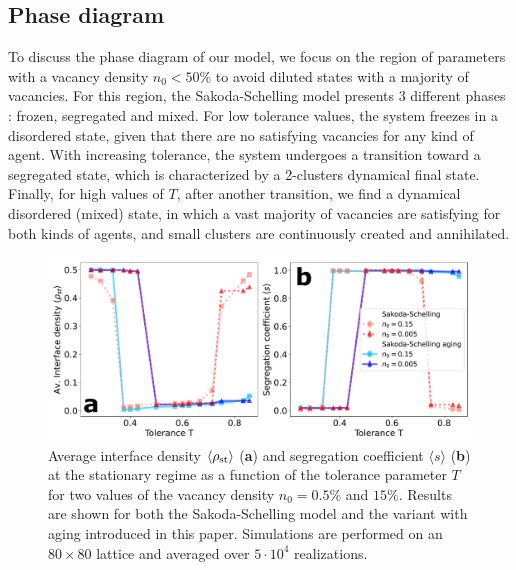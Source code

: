 \subsection{Phase diagram}

To discuss the phase diagram of our model, we focus on the region of parameters with a vacancy density $n_0 < 50 \%$ to avoid diluted states with a majority of vacancies.
For this region, the Sakoda-Schelling model presents 3 different phases \cite{Gauvin_2009}: frozen, segregated and mixed. For low tolerance values, the system freezes in a disordered state, given that there are no satisfying vacancies for any kind of agent. With increasing tolerance, the system undergoes a transition toward a segregated state, which is characterized by a 2-clusters dynamical final state. Finally, for high values of $T$, after another transition, we find a dynamical disordered (mixed) state, in which a vast majority of vacancies are satisfying for both kinds of agents, and small clusters are continuously created and annihilated.

\begin{figure}
\centering \captionsetup{font=sf}
\includegraphics[width=0.95\linewidth]{Figs/Aging_Schelling/fig1new.pdf} 
\caption[Average interface density and segregation coefficient]{Average interface density $\langle\rho_{\rm{st}} \rangle$ (\textbf{a}) and segregation coefficient $\langle s \rangle$ (\textbf{b}) at the stationary regime as a function of the tolerance parameter $T$ for two values of the vacancy density $n_0 = 0.5\%$ and $15\%$. Results are shown for both the Sakoda-Schelling model and the variant with aging introduced in this paper. Simulations are performed on an $80\times 80$ lattice and averaged over $5 \cdot 10^{4}$ realizations.}
\label{Fig1}
\end{figure}


